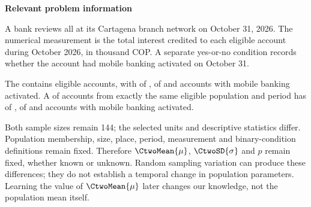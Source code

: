 \secInicio[][sec:p2]

\clearpage



\textbf{Relevant problem information}

\begin{probleminfoexcerpt}
A bank reviews all      at its Cartagena branch network on October 31, 2026. The numerical measurement is the total interest credited to each eligible account during October 2026, in thousand COP. A separate yes-or-no condition records whether the account had mobile banking activated on October 31.
\end{probleminfoexcerpt}

\begin{probleminfoexcerpt}
The     contains  eligible accounts, with    of   ,    of    and  accounts with mobile banking activated. A     of  accounts from exactly the same eligible population and period has   of   ,    of    and  accounts with mobile banking activated.
\end{probleminfoexcerpt}



Both sample sizes remain 144; the selected units and descriptive statistics differ. Population membership, size, place, period, measurement and binary-condition definitions remain fixed. Therefore $\CtwoMean{\mu}$, $\CtwoSD{\sigma}$ and $p$ remain fixed, whether known or unknown. Random sampling variation can produce these differences; they do not establish a temporal change in population parameters. Learning the value of $\CtwoMean{\mu}$ later changes our knowledge, not the population mean itself.

